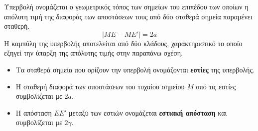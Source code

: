 \documentclass[twoside,nofonts,internet,shmeiwseis]{thewria}
\begin{document}
\orismoi
{} Υπερβολή ονομάζεται ο γεωμετρικός τόπος των σημείων του επιπέδου των οποίων η απόλυτη τιμή της διαφοράς των αποστάσεων τους από δύο σταθερά σημεία παραμένει σταθερή.
\[ |ME-ME'|=2a \]
Η καμπύλη της υπερβολής αποτελείται από δύο κλάδους, χαρακτηριστικό το οποίο εξηγεί την ύπαρξη της απόλυτης τιμής στην παραπάνω σχέση.
\begin{itemize}
\item Τα σταθερά σημεία που ορίζουν την υπερβολή ονομάζονται \textbf{εστίες} της υπερβολής.
\item Η σταθερή διαφορά των αποστάσεων του τυχαίου σημείου $ M $ από τις εστίες συμβολίζεται με $ 2a $.
\item Η απόσταση $ EE' $ μεταξύ των εστιών ονομάζεται \textbf{εστιακή απόσταση} και συμβολίζεται με $ 2\gamma $.
\end{itemize}
\end{document}
